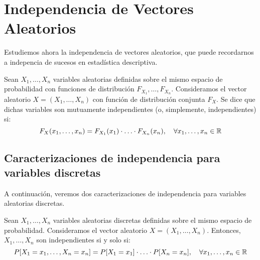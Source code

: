 \chapter{Independencia de Vectores Aleatorios}

Estudiemos ahora la independencia de vectores aleatorios, que puede recordarnos a indepencia de sucesos en estadística descriptiva.
\begin{definicion}
    Sean $X_1, \ldots, X_n$ variables aleatorias definidas sobre el mismo espacio de probabilidad con funciones de distribución $F_{X_1}, \ldots, F_{X_n}$. Consideramos el vector aleatorio $X=(X_1,\dots,X_n)$ con función de distribución conjunta $F_X$. Se dice que dichas variables son mutuamente independientes (o, simplemente, independientes) si:
    \[
        F_X(x_1, \ldots, x_n) = F_{X_1}(x_1) \cdot \ldots \cdot F_{X_n}(x_n), \quad \forall x_1, \ldots, x_n \in \mathbb{R}
    \]
\end{definicion}


\section{Caracterizaciones de independencia para variables discretas}

A continuación, veremos dos caracterizaciones de independencia para variables aleatorias discretas.
\begin{prop}
    Sean $X_1, \ldots, X_n$ variables aleatorias discretas definidas sobre el mismo espacio de probabilidad. Consideramos el vector aleatorio $X=(X_1,\dots,X_n)$. Entonces, $X_1, \ldots, X_n$ son independientes si y solo si:
    \[
        P[X_1 = x_1, \ldots, X_n = x_n] = P[X_1 = x_1] \cdot \ldots \cdot P[X_n = x_n], \quad \forall x_1, \ldots, x_n \in \mathbb{R}
    \]
\end{prop}


